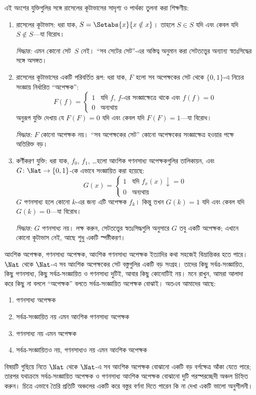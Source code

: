 \documentclass[../../../include/open-logic-section]{subfiles}
\begin{document}

এই অংশের যুক্তিগুলির সঙ্গে রাসেলের কূটাভাসের সাদৃশ্য ও পার্থক্য তুলনা
করা শিক্ষণীয়:
\begin{enumerate}
\item রাসেলের কূটাভাস: ধরা যাক, $S = \Setabs{x}{x \notin x}$। তাহলে
  $S \in S$ যদি এবং কেবল যদি $S \notin S$—যা বিরোধ।

  \emph{সিদ্ধান্ত:} এমন কোনো সেট~$S$ নেই। “সব সেটের সেট”-এর অস্তিত্ব
  অনুমান করা সেটতত্ত্বের অন্যান্য স্বতঃসিদ্ধের সঙ্গে অসঙ্গত।

\item রাসেলের কূটাভাসের একটি পরিবর্তিত রূপ: ধরা যাক, $F$ হলো সব অপেক্ষকের
  সেট থেকে $\{ 0, 1 \}$-এ নিচের সংজ্ঞায় নির্ধারিত “অপেক্ষক”:
  \[
  F(f) =
  \begin{cases}
    1 & \text{যদি $f$, $f$-এর সংজ্ঞাক্ষেত্রে থাকে এবং $f(f) = 0$} \\
    0 & \text{অন্যথায়}
  \end{cases}
  \]
  অনুরূপ যুক্তি দেখায় যে $F(F) = 0$ যদি এবং কেবল যদি $F(F) = 1$—যা
  বিরোধ।

  \emph{সিদ্ধান্ত:} $F$ কোনো অপেক্ষক নয়। “সব অপেক্ষকের সেট” কোনো
  অপেক্ষকের সংজ্ঞাক্ষেত্র হওয়ার পক্ষে অতিরিক্ত বড়।

\item কর্ণীকরণ যুক্তি: ধরা যাক, $f_0$, $f_1$, \dots হলো আংশিক গণনসাধ্য
  অপেক্ষকগুলির তালিকায়ন, এবং $G \colon \Nat \to \{ 0, 1 \}$-কে এভাবে
  সংজ্ঞায়িত করা হয়েছে:
  \[
  G(x) =
  \begin{cases}
    1 & \text{যদি $f_x(x)\downarrow = 0$} \\
    0 & \text{অন্যথায়}
  \end{cases}
  \]
  $G$ গণনসাধ্য হলে কোনো $k$-এর জন্য এটি অপেক্ষক $f_k$। কিন্তু তখন
  $G(k) = 1$ যদি এবং কেবল যদি $G(k) = 0$—যা বিরোধ।

  \emph{সিদ্ধান্ত:} $G$ গণনসাধ্য নয়। লক্ষ করুন, সেটতত্ত্বের
  স্বতঃসিদ্ধগুলি অনুসারে $G$ তবু একটি অপেক্ষক; এখানে কোনো কূটাভাস নেই,
  আছে শুধু একটি স্পষ্টীকরণ।
\end{enumerate}

আংশিক অপেক্ষক, গণনসাধ্য অপেক্ষক, আংশিক গণনসাধ্য অপেক্ষক ইত্যাদির কথা
সহজেই বিভ্রান্তিকর হতে পারে। $\Nat$ থেকে $\Nat$-এ সব আংশিক অপেক্ষকের সেট
বস্তুগুলির একটি বড় সংগ্রহ। তাদের কিছু সর্বত্র-সংজ্ঞায়িত, কিছু গণনসাধ্য,
কিছু সর্বত্র-সংজ্ঞায়িত ও গণনসাধ্য দুটিই, আবার কিছু কোনোটিই নয়। মনে রাখুন,
আমরা আলাদা করে কিছু না বললে “অপেক্ষক” বলতে সর্বত্র-সংজ্ঞায়িত অপেক্ষক
বোঝাই। অতএব আমাদের আছে:
\begin{enumerate}
\item গণনসাধ্য অপেক্ষক
\item সর্বত্র-সংজ্ঞায়িত নয় এমন আংশিক গণনসাধ্য অপেক্ষক
\item গণনসাধ্য নয় এমন অপেক্ষক
\item সর্বত্র-সংজ্ঞায়িতও নয়, গণনসাধ্যও নয় এমন আংশিক অপেক্ষক
\end{enumerate}
বিষয়টি গুছিয়ে নিতে $\Nat$ থেকে $\Nat$-এ সব আংশিক অপেক্ষক বোঝানো একটি
বড় বর্গক্ষেত্র আঁকা যেতে পারে; তারপর যথাক্রমে সর্বত্র-সংজ্ঞায়িত অপেক্ষক
ও গণনসাধ্য আংশিক অপেক্ষক বোঝানো দুটি পরস্পরচ্ছেদী অঞ্চল চিহ্নিত করুন।
চিত্রে এভাবে তৈরি প্রতিটি অঞ্চলের একটি করে বস্তুর বর্ণনা দিতে পারেন কি
না দেখা একটি ভালো অনুশীলনী।
\end{document}
